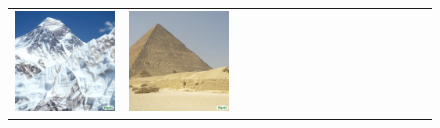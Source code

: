 \begin{figure}
\begin{adjustwidth}{-0.8in}{-0.5in}
\begin{tabular}{cccccccccccccccccccc}
\multicolumn{3}{c}{\includegraphics[width=\twobytwocolwidth\textwidth]{figures/limitations/everest_only.jpg}} &
\multicolumn{3}{c}{\includegraphics[width=\twobytwocolwidth\textwidth]{figures/limitations/pyramid_only.jpg}} &&

\end{tabular}
\end{adjustwidth}
\end{figure}
